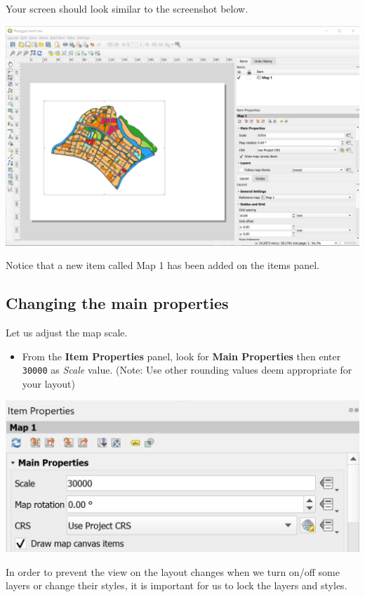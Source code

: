 \documentclass[
  letterpaper,
  DIV=11,
  numbers=noendperiod]{scrreprt}
\providecommand{\tightlist}{%
  \setlength{\itemsep}{0pt}\setlength{\parskip}{0pt}}\usepackage{longtable,booktabs,array}
\begin{document}
Your screen should look similar to the screenshot below.

\includegraphics{./img04/image49.jpg}

Notice that a new item called Map 1 has been added on the items panel.

\hypertarget{changing-the-main-properties}{%
\subsection{Changing the main
properties}\label{changing-the-main-properties}}

Let us adjust the map scale.

\begin{itemize}
\tightlist
\item
  From the \textbf{Item Properties} panel, look for \textbf{Main
  Properties} then enter \texttt{30000} as \emph{Scale} value. (Note:
  Use other rounding values deem appropriate for your layout)
\end{itemize}

\includegraphics[width=6.07292in,height=\textheight]{./img04/image50.jpg}

In order to prevent the view on the layout changes when we turn on/off
some layers or change their styles, it is important for us to lock the
layers and styles.
\end{document}

